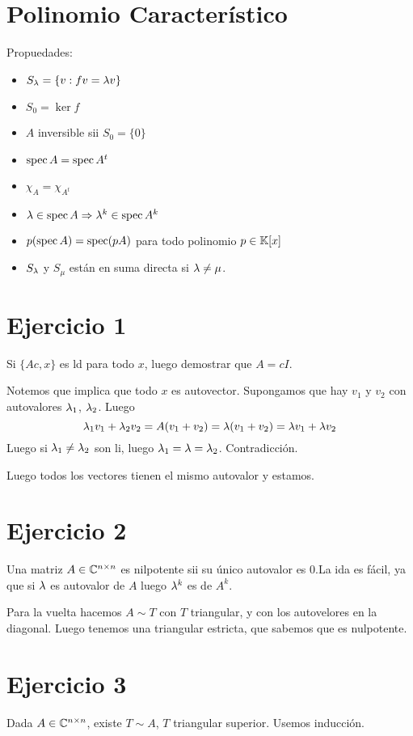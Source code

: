 \documentclass{article}
\begin{document}
\section*{Polinomio Característico}
Propuedades:
\begin{itemize}
	\item $S_\lambda = \{v : fv = \lambda v\}$
	\item $S_0 = \ker f$
	\item $A$ inversible sii $S_0 = \{0\}$
	\item $\operatorname{spec} A = \operatorname{spec} A^t$
	\item $\chi_A = \chi_{A^t}$
	\item $\lambda \in \operatorname{spec} A \Rightarrow \lambda^k \in \operatorname{spec} A^k$
	\item $p (\operatorname{spec} A) = \operatorname{spec} (pA)$ para todo polinomio $p \in \mathbb{K}[x]$
	\item $S_\lambda$ y $S_\mu$ están en suma directa si $\lambda \neq \mu$.
\end{itemize}

\section*{Ejercicio 1}
Si $\{Ac, x\}$ es ld para todo $x$, luego demostrar que $A = cI$.

Notemos que implica que todo $x$ es autovector. Supongamos que hay $v_1$ y $v_2$ con autovalores $\lambda_1$, $\lambda_2$. Luego
\[
	\lambda_1 v_1 + \lambda_2 v_2 = A(v_1 + v_2) = \lambda(v_1 + v_2) = \lambda v_1 + \lambda v_2
\]
Luego si $\lambda_1 \neq \lambda_2$ son li, luego $\lambda_1 = \lambda = \lambda_2$. Contradicción.

Luego todos los vectores tienen el mismo autovalor y estamos.

\section*{Ejercicio 2}
Una matriz $A \in \mathbb{C}^{n \times n}$ es nilpotente sii su único autovalor es $0$.La ida es fácil, ya que si $\lambda$ es autovalor de $A$ luego $\lambda^k$ es de $A^k$.

Para la vuelta hacemos $A \sim T$ con $T$ triangular, y con los autovelores en la diagonal. Luego tenemos una triangular estricta, que sabemos que es nulpotente.

\section*{Ejercicio 3}
Dada $A \in \mathbb{C}^{n \times n}$, existe $T \sim A$, $T$ triangular superior. Usemos inducción.
\end{document}
